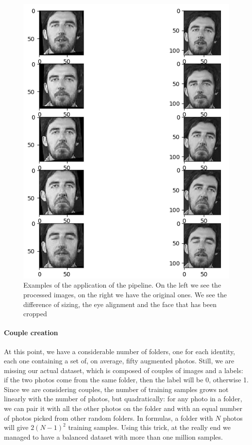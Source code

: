 \begin{figure}[t]
\includegraphics[width=1\linewidth]{images/processed.png}
   \caption{Examples of the application of the pipeline. On the left we see the processed images, on the right we have the original ones. We see the difference of sizing, the eye alignment and the face that has been cropped}
\label{fig:long}
\label{fig:onecol}
\end{figure}

\paragraph{Couple creation}
At this point, we have a considerable number of folders, one for each identity, each one containing a set of, on average, fifty augmented photos. Still, we are missing our actual dataset, which is composed of couples of images and a labels: if the two photos come from the same folder, then the label will be 0, otherwise 1. Since we are considering couples, the number of training samples grows not linearly with the number of photos, but quadratically: for any photo in a folder, we can pair it with all the other photos on the folder and with an equal number of photos picked from other random folders. In formulas, a folder with $N$ photos will give $2(N-1)^2$ training samples.
Using this trick, at the really end we managed to have a balanced dataset with more than one million samples.

